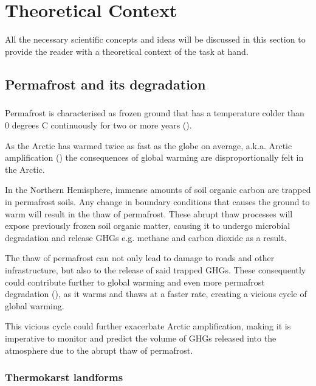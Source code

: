 \chapter{Theoretical Context} \label{lit_review}

All the necessary scientific concepts and ideas will be discussed in this section to provide the reader with a theoretical context of the task at hand.

\section{Permafrost and its degradation}  \label{perma_intro}
\paragraph{}
Permafrost is characterised as frozen ground that has a temperature colder than 0 degrees C continuously for two or more years (\cite{everdingen_multi-language_1998}).

As the Arctic has warmed twice as fast as the globe on average, \gls{a.k.a.} Arctic amplification (\cite{climatechangefur}) the consequences of global warming are disproportionally felt in the Arctic. 

In the Northern Hemisphere, immense amounts of soil organic carbon are trapped in permafrost soils. Any change in boundary conditions that causes the ground to warm will result in the thaw of permafrost. These abrupt thaw processes will expose previously frozen soil organic matter, causing it to undergo microbial degradation and release \gls{GHGs} \gls{e.g.} methane and carbon dioxide as a result.

The thaw of permafrost can not only lead to damage to roads and other infrastructure, but also to the release of said trapped \gls{GHGs}. These consequently could contribute further to global warming and even more permafrost degradation (\cite{MURTON2021857}), as it warms and thaws at a faster rate, creating a vicious cycle of global warming.

This vicious cycle could further exacerbate Arctic amplification, making it is imperative to monitor and predict the volume of GHGs released into the atmosphere due to the abrupt thaw of permafrost.

\subsection{Thermokarst landforms}  \label{thermokarst_intro}

